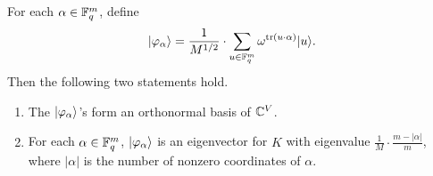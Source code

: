 \begin{lemma}\label{prop:eigenvectors}
	\leanok
	For each $\alpha \in \mathbb{F}_q^m$, define
	\[
		\lvert \varphi_\alpha \rangle
		=
		\frac{1}{M^{1/2}} \cdot \sum_{u \in \mathbb{F}_q^m} \omega^{\operatorname{tr}(u\cdot \alpha)} \lvert u \rangle.
	\]
	Then the following two statements hold.
	\begin{enumerate}
		\item The $\lvert \varphi_\alpha \rangle$'s form an orthonormal basis of $\mathbb{C}^V$.\label{item:orthonormal}
		\item For each $\alpha \in \mathbb{F}_q^m$, $\lvert \varphi_\alpha \rangle$ is an eigenvector for $K$ with eigenvalue $\frac{1}{M} \cdot \frac{m-|\alpha|}{m}$, where $|\alpha|$ is the number of nonzero coordinates of $\alpha$.\label{item:eigenvector}
	\end{enumerate}
\end{lemma}
